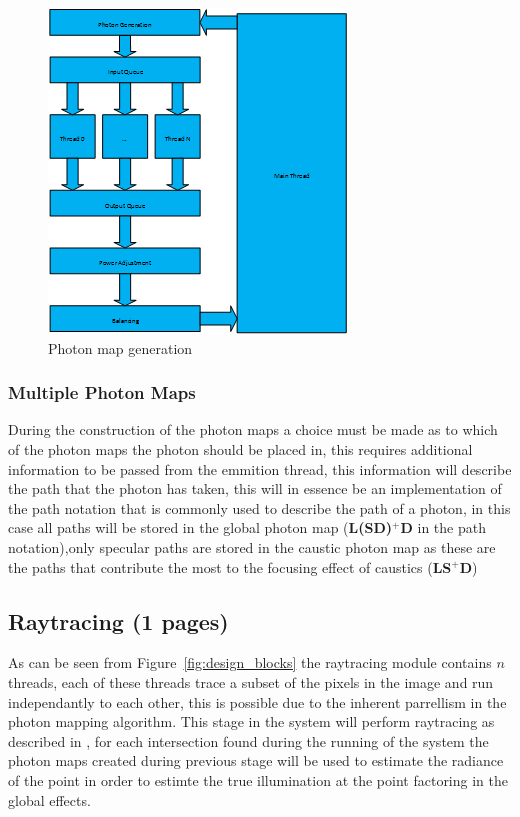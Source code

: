 \begin{figure}
\centering
\includegraphics{./images/photon_threading.png}
\caption{Photon map generation}
\label{fig:photon_generation}
\end{figure}

\subsubsection{Multiple Photon Maps}
During the construction of the photon maps a choice must be made as to which of the photon maps the photon
should be placed in, this requires additional information to be passed from the emmition thread, this information
will describe the path that the photon has taken, this will in essence be an implementation of the path notation
that is commonly used to describe the path of a photon, in this case all paths will be stored in the global photon
map (\textbf{L(S\textbar D)$^+$D} in the path notation),only specular paths are stored in the caustic photon map
as these are the paths that contribute the most to the focusing effect of caustics (\textbf{LS$^+$D})


\subsection{Raytracing (1 pages)}
As can be seen from Figure~\ref{fig:design_blocks} the raytracing module contains $n$ threads, each of these
threads trace a subset of the pixels in the image and run independantly to each other, this is possible due
to the inherent parrellism in the photon mapping algorithm. This stage in the system will perform raytracing
as described in , for each intersection found during the running of the system the photon
maps created during previous stage will be used to estimate the radiance of the point in order to estimte the
true illumination at the point factoring in the global effects.

